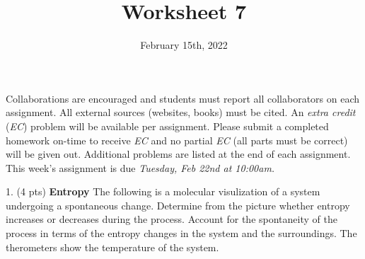 \documentclass[11pt]{article}
\title{\textbf{Worksheet 7}}
\date{\vspace{-2em}February 15th, 2022}
\begin{document}
\maketitle

Collaborations are encouraged and students must report all collaborators
on each assignment. All external sources (websites, books) must be
cited. An \textit{extra credit} (\textit{EC}) problem will be available per
assignment. Please submit a completed homework on-time to receive \textit{EC}
and no partial \textit{EC} (all parts must be correct) will be given out.
Additional problems are listed at the end of each assignment. This week's
assignment is due \textit{Tuesday, Feb 22nd at 10:00am.}

1. (4 pts) \textbf{Entropy} The following is a molecular visulization of a system undergoing a spontaneous
change. Determine from the picture whether entropy increases or decreases during the
process. Account for the spontaneity of the process in terms of the entropy changes
in the system and the surroundings. The therometers show the temperature of the
system.
\end{document}
